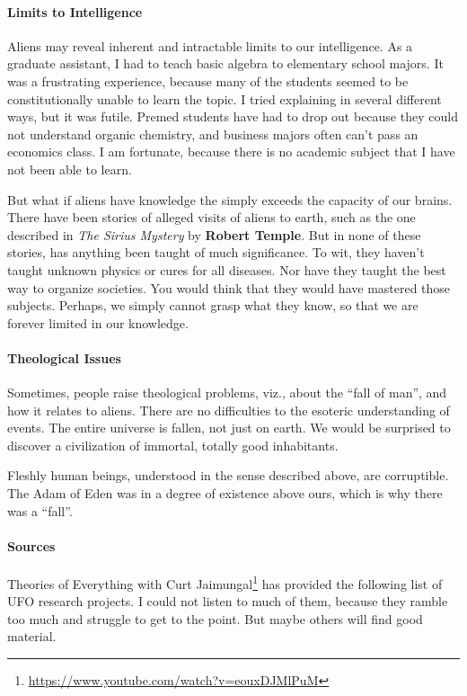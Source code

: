 \paragraph{Limits to Intelligence}


Aliens may reveal inherent and intractable limits to our intelligence. As a graduate assistant, I had to teach basic algebra to elementary school majors. It was a frustrating experience, because many of the students seemed to be constitutionally unable to learn the topic. I tried explaining in several different ways, but it was futile. Premed students have had to drop out because they could not understand organic chemistry, and business majors often can't pass an economics class. I am fortunate, because there is no academic subject that I have not been able to learn.

But what if aliens have knowledge the simply exceeds the capacity of our brains. There have been stories of alleged visits of aliens to earth, such as the one described in \emph{The Sirius Mystery} by \textbf{Robert Temple}. But in none of these stories, has anything been taught of much significance. To wit, they haven't taught unknown physics or cures for all diseases. Nor have they taught the best way to organize societies. You would think that they would have mastered those subjects. Perhaps, we simply cannot grasp what they know, so that we are forever limited in our knowledge.

\paragraph{Theological Issues}


Sometimes, people raise theological problems, viz., about the ``fall of man'', and how it relates to aliens. There are no difficulties to the esoteric understanding of events. The entire universe is fallen, not just on earth. We would be surprised to discover a civilization of immortal, totally good inhabitants.

Fleshly human beings, understood in the sense described above, are corruptible. The Adam of Eden was in a degree of existence above ours, which is why there was a ``fall''.

\paragraph{Sources}


Theories of Everything with Curt Jaimungal\footnote{\url{https://www.youtube.com/watch?v=eouxDJMlPuM}} has provided the following list of UFO research projects. I could not listen to much of them, because they ramble too much and struggle to get to the point. But maybe others will find good material.

